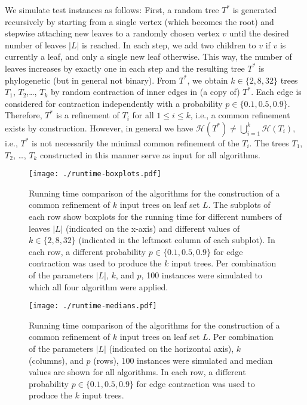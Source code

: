 \documentclass[11pt]{article}
\newcommand{\HH}{\mathcal{H}}
\begin{document}
We simulate test instances as follows: First, a random tree $T^*$ is
generated recursively by starting from a single vertex (which becomes the
root) and stepwise attaching new leaves to a randomly chosen vertex $v$
until the desired number of leaves $|L|$ is reached.  In each step, we add
two children to $v$ if $v$ is currently a leaf, and only a single new leaf
otherwise.  This way, the number of leaves increases by exactly one in each
step and the resulting tree $T^*$ is phylogenetic (but in general not
binary).  From $T^*$, we obtain $k\in\{2,8,32\}$ trees $T_1$, $T_2$,\dots,
$T_k$ by random contraction of inner edges in (a copy of) $T^*$.  Each edge
is considered for contraction independently with a probability
$p\in\{0.1,0.5,0.9\}$. Therefore, $T^*$ is a refinement of $T_i$ for all
$1\le i\le k$, i.e., a common refinement exists by construction. However,
in general we have $\HH(T^*)\ne \bigcup_{i=1}^k \HH(T_i)$, i.e., $T^*$ is
not necessarily the minimal common refinement of the $T_i$.  The trees
$T_1$, $T_2$, \dots, $T_k$ constructed in this manner serve as input for
all algorithms.

\begin{figure}[t]
  \begin{center}
    \texttt{[image: ./runtime-boxplots.pdf]}
  \end{center}
  \caption{Running time comparison of the algorithms for the construction
    of a common refinement of $k$ input trees on leaf set $L$.  The
    subplots of each row show boxplots for the running time for different
    numbers of leaves $|L|$ (indicated on the x-axis) and different values
    of $k\in\{2, 8, 32\}$ (indicated in the leftmost column of each
    subplot).  In each row, a different probability $p\in\{0.1, 0.5, 0.9\}$
    for edge contraction was used to produce the $k$ input trees.  Per
    combination of the parameters $|L|$, $k$, and $p$, 100 instances were
    simulated to which all four algorithm were applied.}
  \label{fig:runtime-boxplots}
\end{figure}

\begin{figure}[t]
  \begin{center}
    \texttt{[image: ./runtime-medians.pdf]}
  \end{center}
  \caption{Running time comparison of the algorithms for the construction
    of a common refinement of $k$ input trees on leaf set $L$.  Per
    combination of the parameters $|L|$ (indicated on the horizontal axis),
    $k$ (columns), and $p$ (rows), 100 instances were simulated and median
    values are shown for all algorithms.  In each row, a different
    probability $p\in\{0.1, 0.5, 0.9\}$ for edge contraction was used to
    produce the $k$ input trees.}
  \label{fig:runtime-medians}
\end{figure}
\end{document}
